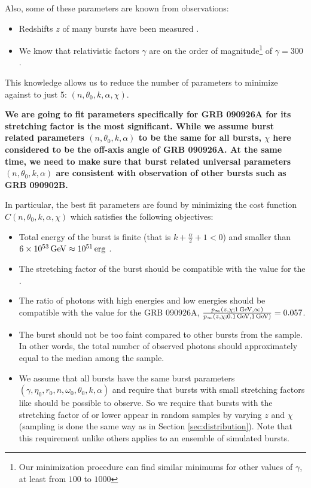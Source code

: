 \documentclass[manuscript]{aastex}
\begin{document}
Also, some of these parameters are known from observations:
\begin{itemize}
	\item{Redshifts $z$ of many bursts have been measured
          \citep{Ackermann:2013zfa}.}
	\item{We know that relativistic factors $\gamma$ are on the
          order of magnitude\footnote{Our minimization procedure can
            find similar minimums for other values of $\gamma$, at
            least from $100$ to $1000$} of $\gamma = 300$
          \citep{Ghirlanda:2011bn}.}
\end{itemize}
This knowledge allows us to reduce the number of parameters to minimize against to just 5: $\left(n, \theta_0, k, \alpha, \chi\right)$.

{\bf We are going to fit parameters specifically for GRB 090926A for its stretching factor is the most significant. While we assume burst related parameters $\left(n, \theta_0, k, \alpha\right)$ to be the same for all bursts, $\chi$ here considered to be the off-axis angle of GRB 090926A. At the same time, we need to make sure that burst related universal parameters $\left(n, \theta_0, k, \alpha\right)$ are consistent with observation of other bursts such as GRB 090902B.

In particular, the best fit parameters are found by minimizing the cost function
$C\left(n, \theta_0, k, \alpha, \chi\right)$ which
satisfies the following objectives:}
\begin{itemize}
	\item { Total energy of the burst is finite (that is
          $k+\frac{\alpha}{2}+1 < 0$) and smaller than $\unit[6 \times
            10^{53}]{GeV} \approx \unit[10^{51}]{erg}$
          \citep{Gehrels:2013xd}.  }
	\item { The stretching factor of the burst should be
          compatible with the value for the .  }
	\item { The ratio of photons with high energies and low
          energies should be compatible with the value for the GRB
          090926A, $\frac{p_{\infty}
            \left(z,\chi;\unit[1]{GeV},\infty\right)}{p_{\infty}
            \left(z,\chi;\unit[0.1]{GeV},\unit[1]{GeV}\right)} =
          0.057$.  }
	\item { The burst should not be too faint compared to
          other bursts from the sample. In other words, the total
          number of observed photons should approximately equal to the
          median among the sample.  }
	\item { We assume that all bursts have the same burst
          parameters $\left(\gamma, \eta_0, r_0, n, \omega_0,
          \theta_0, k, \alpha\right)$ and require that bursts with
          small stretching factors like  should be possible
          to observe. So we require that bursts with the stretching
          factor of  or lower appear in random samples by
          varying $z$ and $\chi$ (sampling is done the same way as in
          Section \ref{sec:distribution}). Note that this requirement
          unlike others applies to an ensemble of simulated bursts. }
\end{itemize}
\end{document}
